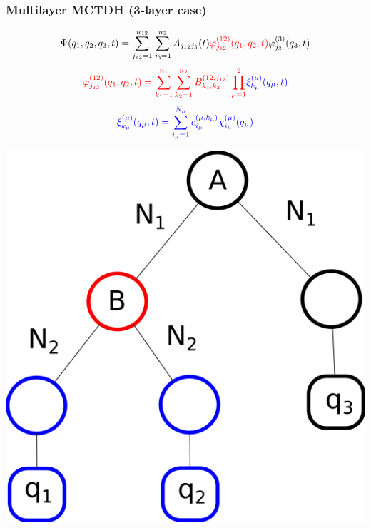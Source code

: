 \documentclass{beamer}
\begin{document}
\begin{frame}
  \frametitle{Multilayer MCTDH (3-layer case)}
  \begin{minipage}{0.3\linewidth}
    \tiny{
\begin{equation*}
	\Psi(q_1, q_2, q_3, t) = \sum_{j_{12}=1}^{n_{12}}\sum_{j_3 = 1}^{n_3}A_{j_{12}j_3}(t)\textcolor{red}{\varphi^{(12)}_{j_{12}}(q_1,q_2,t)}\varphi^{(3)}_{j_{3}}(q_3,t)
\end{equation*}
\begin{equation*}
	\textcolor{red}{\varphi^{(12)}_{j_{12}}(q_1,q_2,t) = \sum_{k_1 = 1}^{n_1}\sum_{k_2=1}^{n_2}B_{k_1,k_2}^{(12,j_{12})}\prod_{\mu=1}^2} \textcolor{blue}{\xi_{k_{\mu}}^{(\mu)}(q_{\mu},t)}
\end{equation*}
\begin{equation*}
	\textcolor{blue}{\xi_{k_{\mu}}^{(\mu)}(q_{\mu},t) = \sum_{i_{\mu}=1}^{N_{\mu}} c_{i_{\mu}}^{(\mu,k_{\mu})}\chi_{i_{\mu}}^{(\mu)}(q_{\mu})}
\end{equation*}}
\end{minipage}
\hfill
  \begin{minipage}{0.4\linewidth}
  \begin{center}
    \includegraphics[scale=.26]{mlmctdh.png}
  \end{center}
  \end{minipage}
\end{frame}
\end{document}
